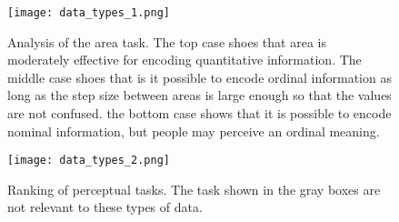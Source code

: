 \begin{figure}[H]
    \centering
    \texttt{[image: data\_types\_1.png]}
    \caption{Analysis of the area task. The top case shoes that area is moderately effective for encoding quantitative information. The middle case shoes that is it possible to encode ordinal information as long as the step size between areas is large enough so that the values are not confused. the bottom case shows that it is possible to encode nominal information, but people may perceive an ordinal meaning.}
    \label{fig:data_types_1}
\end{figure}
\begin{figure}[H]
    \centering
    \texttt{[image: data\_types\_2.png]}
    \caption{Ranking of perceptual tasks. The task shown in the gray boxes are not relevant to these types of data.}
    \label{fig:data_types_2}
\end{figure}


